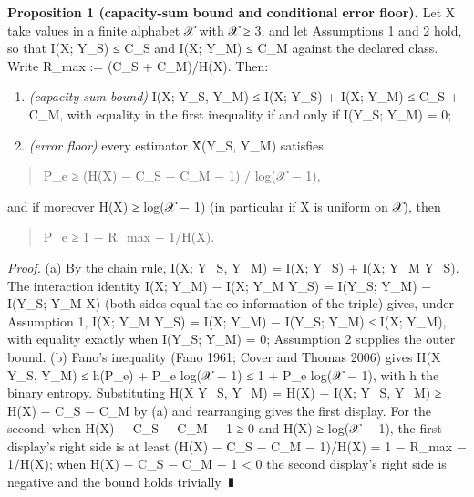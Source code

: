 \documentclass[
]{llncs}
\begin{document}
\textbf{Proposition 1 (capacity-sum bound and conditional error floor).}
Let X take values in a finite alphabet 𝒳 with \textbar 𝒳\textbar{} ≥ 3,
and let Assumptions 1 and 2 hold, so that I(X; Y\_S) ≤ C\_S and I(X;
Y\_M) ≤ C\_M against the declared class. Write R\_max := (C\_S +
C\_M)/H(X). Then:

\begin{enumerate}
\def\labelenumi{(\alph{enumi})}
\item
  \emph{(capacity-sum bound)} I(X; Y\_S, Y\_M) ≤ I(X; Y\_S) + I(X; Y\_M)
  ≤ C\_S + C\_M, with equality in the first inequality if and only if
  I(Y\_S; Y\_M) = 0;
\item
  \emph{(error floor)} every estimator X̂(Y\_S, Y\_M) satisfies
\end{enumerate}

\begin{quote}
P\_e ≥ (H(X) − C\_S − C\_M − 1) / log(\textbar 𝒳\textbar{} − 1),
\end{quote}

and if moreover H(X) ≥ log(\textbar 𝒳\textbar{} − 1) (in particular if X
is uniform on 𝒳), then

\begin{quote}
P\_e ≥ 1 − R\_max − 1/H(X).
\end{quote}

\emph{Proof.} (a) By the chain rule, I(X; Y\_S, Y\_M) = I(X; Y\_S) +
I(X; Y\_M \textbar{} Y\_S). The interaction identity I(X; Y\_M) − I(X;
Y\_M \textbar{} Y\_S) = I(Y\_S; Y\_M) − I(Y\_S; Y\_M \textbar{} X) (both
sides equal the co-information of the triple) gives, under Assumption 1,
I(X; Y\_M \textbar{} Y\_S) = I(X; Y\_M) − I(Y\_S; Y\_M) ≤ I(X; Y\_M),
with equality exactly when I(Y\_S; Y\_M) = 0; Assumption 2 supplies the
outer bound. (b) Fano's inequality (Fano 1961; Cover and Thomas 2006)
gives H(X \textbar{} Y\_S, Y\_M) ≤ h(P\_e) + P\_e
log(\textbar 𝒳\textbar{} − 1) ≤ 1 + P\_e log(\textbar 𝒳\textbar{} − 1),
with h the binary entropy. Substituting H(X \textbar{} Y\_S, Y\_M) =
H(X) − I(X; Y\_S, Y\_M) ≥ H(X) − C\_S − C\_M by (a) and rearranging
gives the first display. For the second: when H(X) − C\_S − C\_M − 1 ≥ 0
and H(X) ≥ log(\textbar 𝒳\textbar{} − 1), the first display's right side
is at least (H(X) − C\_S − C\_M − 1)/H(X) = 1 − R\_max − 1/H(X); when
H(X) − C\_S − C\_M − 1 \textless{} 0 the second display's right side is
negative and the bound holds trivially. ∎
\end{document}
